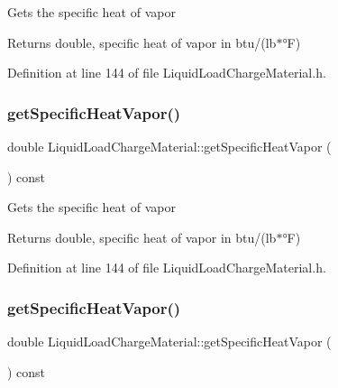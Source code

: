 Gets the specific heat of vapor \begin{DoxyReturn}{Returns}
double, specific heat of vapor in btu/(lb$\ast$°F) 
\end{DoxyReturn}


Definition at line 144 of file Liquid\+Load\+Charge\+Material.\+h.

\mbox{\label{class_liquid_load_charge_material_ac4538f9722bf25465ec86586469a7b1e}} 
\subsubsection{\texorpdfstring{get\+Specific\+Heat\+Vapor()}{getSpecificHeatVapor()}\hspace{0.1cm}{\footnotesize\ttfamily [2/3]}}
{\footnotesize\ttfamily double Liquid\+Load\+Charge\+Material\+::get\+Specific\+Heat\+Vapor (\begin{DoxyParamCaption}{ }\end{DoxyParamCaption}) const\hspace{0.3cm}{\ttfamily [inline]}}

Gets the specific heat of vapor \begin{DoxyReturn}{Returns}
double, specific heat of vapor in btu/(lb$\ast$°F) 
\end{DoxyReturn}


Definition at line 144 of file Liquid\+Load\+Charge\+Material.\+h.

\mbox{\label{class_liquid_load_charge_material_ac4538f9722bf25465ec86586469a7b1e}} 
\subsubsection{\texorpdfstring{get\+Specific\+Heat\+Vapor()}{getSpecificHeatVapor()}\hspace{0.1cm}{\footnotesize\ttfamily [3/3]}}
{\footnotesize\ttfamily double Liquid\+Load\+Charge\+Material\+::get\+Specific\+Heat\+Vapor (\begin{DoxyParamCaption}{ }\end{DoxyParamCaption}) const\hspace{0.3cm}{\ttfamily [inline]}}


